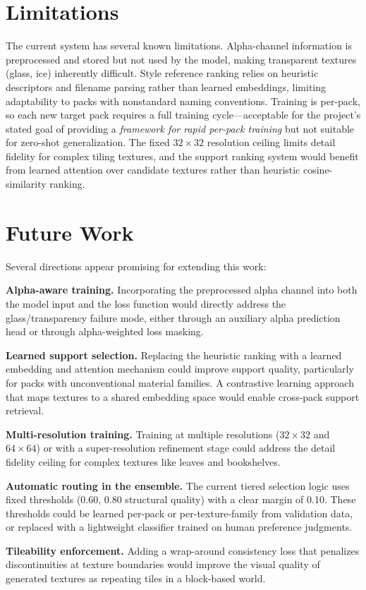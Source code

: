 \section{Limitations}

The current system has several known limitations. Alpha-channel information is preprocessed and stored but not used by the model, making transparent textures (glass, ice) inherently difficult. Style reference ranking relies on heuristic descriptors and filename parsing rather than learned embeddings, limiting adaptability to packs with nonstandard naming conventions. Training is per-pack, so each new target pack requires a full training cycle---acceptable for the project's stated goal of providing a \emph{framework for rapid per-pack training} but not suitable for zero-shot generalization. The fixed $32\times32$ resolution ceiling limits detail fidelity for complex tiling textures, and the support ranking system would benefit from learned attention over candidate textures rather than heuristic cosine-similarity ranking.

\section{Future Work}

Several directions appear promising for extending this work:

\textbf{Alpha-aware training.} Incorporating the preprocessed alpha channel into both the model input and the loss function would directly address the glass/transparency failure mode, either through an auxiliary alpha prediction head or through alpha-weighted loss masking.

\textbf{Learned support selection.} Replacing the heuristic ranking with a learned embedding and attention mechanism could improve support quality, particularly for packs with unconventional material families. A contrastive learning approach that maps textures to a shared embedding space would enable cross-pack support retrieval.

\textbf{Multi-resolution training.} Training at multiple resolutions ($32\times32$ and $64\times64$) or with a super-resolution refinement stage could address the detail fidelity ceiling for complex textures like leaves and bookshelves.

\textbf{Automatic routing in the ensemble.} The current tiered selection logic uses fixed thresholds (0.60, 0.80 structural quality) with a clear margin of 0.10. These thresholds could be learned per-pack or per-texture-family from validation data, or replaced with a lightweight classifier trained on human preference judgments.

\textbf{Tileability enforcement.} Adding a wrap-around consistency loss that penalizes discontinuities at texture boundaries would improve the visual quality of generated textures as repeating tiles in a block-based world.
